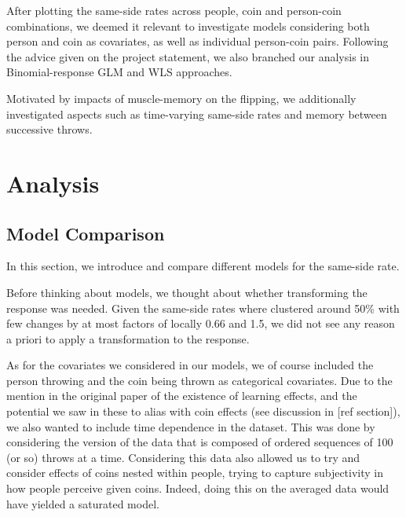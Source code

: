\documentclass[a4paper, 12pt,oneside]{article}
\begin{document}
		After plotting the same-side rates across people, coin and person-coin combinations, we deemed it relevant to investigate models considering both person and coin as covariates, as well as individual person-coin pairs. Following the advice given on the project statement, we also branched our analysis in Binomial-response GLM and WLS approaches. 

		Motivated by impacts of muscle-memory on the flipping, we additionally investigated aspects such as time-varying same-side rates and memory between successive throws.
	\section{Analysis}
		\subsection{Model Comparison}
			In this section, we introduce and compare different models for the same-side rate. 

			Before thinking about models, we thought about whether transforming the response was needed. Given the same-side rates where clustered around 50\% with few changes by at most factors of locally 0.66 and 1.5, we did not see any reason a priori to apply a transformation to the response.
			
			As for the covariates we considered in our models, we of course included the person throwing and the coin being thrown as categorical covariates. Due to the mention in the original paper of the existence of learning effects, and the potential we saw in these to alias with coin effects (see discussion in [ref section]), we also wanted to include time dependence in the dataset. This was done by considering the version of the data that is composed of ordered sequences of 100 (or so) throws at a time. Considering this data also allowed us to try and consider effects of coins nested within people, trying to capture subjectivity in how people perceive given coins. Indeed, doing this on the averaged data would have yielded a saturated model. 
			
\end{document}
